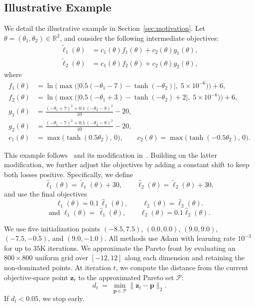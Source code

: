 \documentclass[sigconf]{acmart}
\begin{document}
\subsection{Illustrative Example}
\label{appdix:example}
We detail the illustrative example in Section~\ref{sec:motivation}.
Let $\theta=(\theta_1,\theta_2)\in\mathbb{R}^2$, and consider the following intermediate objectives:
\begin{align*}
\tilde{\ell}_1(\theta) &= c_1(\theta) f_1(\theta) + c_2(\theta) g_1(\theta), \\
\tilde{\ell}_2(\theta) &= c_1(\theta) f_2(\theta) + c_2(\theta) g_2(\theta),
\end{align*}
where
\begin{align*}
f_1(\theta) &= \ln\!\Big(\max\big(\big|0.5(-\theta_1-7)-\tanh(-\theta_2)\big|,\;5\times 10^{-6}\big)\Big) + 6, \\
f_2(\theta) &= \ln\!\Big(\max\big(\big|0.5(-\theta_1+3)-\tanh(-\theta_2)+2\big|,\;5\times 10^{-6}\big)\Big) + 6, \\
g_1(\theta) &= \frac{(-\theta_1+7)^2 + 0.1\,(-\theta_2-8)^2}{10} - 20, \\
g_2(\theta) &= \frac{(-\theta_1-7)^2 + 0.1\,(-\theta_2-8)^2}{10} - 20, \\
c_1(\theta) &= \max\!\big(\tanh(0.5\theta_2),\,0\big), \qquad
c_2(\theta) = \max\!\big(\tanh(-0.5\theta_2),\,0\big).
\end{align*}

This example follows~\cite{liu2021conflict} and its modification in~\cite{navon2022multi}.
Building on the latter modification, we further adjust the objectives by adding a constant shift to keep both losses positive. Specifically, we define
\begin{equation*}
\hat{\ell}_1(\theta)=\tilde{\ell}_1(\theta)+30,\qquad \hat{\ell}_2(\theta)=\tilde{\ell}_2(\theta)+30,
\end{equation*}
and use the final objectives
\begin{equation*}
\ell_1(\theta)=0.1\,\hat{\ell}_1(\theta),\qquad \ell_2(\theta)=\hat{\ell}_2(\theta). 
\end{equation*}
\begin{equation*}
\text{and }\ell_1(\theta)=\,\hat{\ell}_1(\theta),\qquad \ell_2(\theta)=0.1\hat{\ell}_2(\theta). 
\end{equation*}

We use five initialization points $(-8.5,7.5)$, $(0.0,0.0)$, $(9.0,9.0)$, $(-7.5,-0.5)$, and $(9.0,-1.0)$. All methods use Adam with learning rate $10^{-3}$ for up to $35\mathrm{K}$ iterations. 
We approximate the Pareto front by evaluating an $800\times800$ uniform grid over $[-12,12]$ along each dimension and retaining the non-dominated points. At iteration $t$, we compute the distance from the current objective-space point $\mathbf{z}_t$ to the approximated Pareto set $\mathcal{P}$:
\[
d_t \;=\; \min_{\mathbf{p}\in\mathcal{P}} \|\mathbf{z}_t-\mathbf{p}\|_2 .
\]
If $d_t<0.05$, we stop early.
\end{document}
